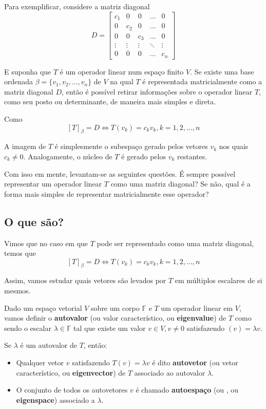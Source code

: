 \documentclass[12pt,a4paper]{article}
\begin{document}
Para exemplificar, considere a matriz diagonal
\[
D = \begin{bmatrix}
c_1 & 0 & 0 & \ldots & 0 \\
0 & c_2 & 0 & \ldots & 0 \\
0 & 0 & c_3 & \ldots & 0 \\
\vdots & \vdots & \vdots & \ddots & \vdots \\
0 & 0 & 0 & \ldots & c_n
\end{bmatrix}
\]

E suponha que $T$ é um operador linear num espaço finito $V$. Se existe uma base ordenada $\beta = \{ v_1, v_2, \ldots, v_n \}$ de $V$ na qual $T$ é representada matricialmente como a matriz diagonal $D$, então é possível retirar informações sobre o operador linear $T$, como seu posto ou determinante, de maneira mais simples e direta.

Como 
\[
[T]_\beta = D \iff T(v_k) = c_k v_k, k = 1, 2, \ldots, n
\]

A imagem de $T$ é simplesmente o subespaço gerado pelos vetores $v_k$ nos quais $c_k \neq 0$. Analogamente, o núcleo de $T$ é gerado pelos $v_k$ restantes.

Com isso em mente, levantam-se as seguintes questões. É sempre possível representar um operador linear $T$ como uma matriz diagonal? Se não, qual é a forma mais simples de representar matricialmente esse operador?

\subsection{O que são?}

Vimos que no caso em que $T$ pode ser representado como uma matriz diagonal, temos que
\[
[T]_\beta = D \iff T(v_k) = c_k v_k, k = 1, 2, \ldots, n
\]

Assim, vamos estudar quais vetores são levados por $T$ em múltiplos escalares de si mesmos.

Dado um espaço vetorial $V$ sobre um corpo $\mathbb{F}$ e $T$ um operador linear em $V$, vamos definir o \textbf{autovalor} (ou valor característico, ou \textbf{eigenvalue}) de $T$ como sendo o escalar $\lambda \in \mathbb{F}$ tal que existe um valor $v \in V, v \neq 0$ satisfazendo $(v) = \lambda v$.

Se $\lambda$ é um autovalor de $T$, então: 

\begin{itemize}
\item Qualquer vetor $v$ satisfazendo $T(v) = \lambda v$ é dito \textbf{autovetor} (ou vetor característico, ou \textbf{eigenvector})  de $T$ associado ao autovalor $\lambda$.
\item O conjunto de todos os autovetores $v$ é chamado \textbf{autoespaço} (ou , ou \textbf{eigenspace}) associado a $\lambda$.
\end{itemize}
\end{document}
